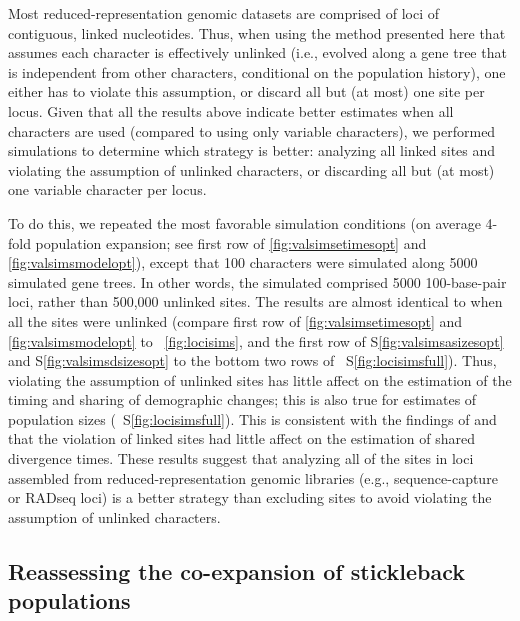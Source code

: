 Most reduced-representation genomic datasets are comprised of loci of
contiguous, linked nucleotides.
Thus, when using the method presented here that assumes each character is
effectively unlinked (i.e., evolved along a gene tree that is independent from
other characters, conditional on the population history), one either has to
violate this assumption, or discard all but (at most) one site per locus.
Given that all the results above indicate better estimates when all
characters are used (compared to using only variable characters), we
performed simulations to determine which strategy is better:
analyzing all linked sites and violating the assumption of unlinked characters,
or discarding all but (at most) one variable character per locus.

To do this, we repeated the most favorable simulation conditions (on average
4-fold population expansion; see first row of
\figs
\ref{fig:valsimsetimesopt}
and
\ref{fig:valsimsmodelopt}),
except that 100 characters were simulated along 5000
simulated gene trees.
In other words, the simulated \datasets comprised 5000
100-base-pair loci, rather than 500,000 unlinked sites.
The results are almost identical to when all the sites were unlinked
(compare first row of
\figs
\ref{fig:valsimsetimesopt}
and
\ref{fig:valsimsmodelopt}
to
\fig{}~\ref{fig:locisims},
and the first row of
\figs
S\ref{fig:valsimsasizesopt}
and
S\ref{fig:valsimsdsizesopt}
to the bottom two rows of
\fig{}~S\ref{fig:locisimsfull}).
Thus, violating the assumption of unlinked sites has little
affect on the estimation of the timing and sharing of
demographic changes;
this is also true for estimates of population sizes
(\fig{}~S\ref{fig:locisimsfull}).
This is consistent with the findings of
\citet{Oaks2018ecoevolity} and
\citet{Oaks2018paic}
that the violation of linked sites had little affect on the estimation of
shared divergence times.
These results suggest that analyzing all of the sites in loci assembled from
reduced-representation genomic libraries (e.g., sequence-capture or RADseq
loci) is a better strategy than excluding sites to avoid violating the
assumption of unlinked characters.

\ifembed{

}{}




\subsection{Reassessing the co-expansion of stickleback populations}

